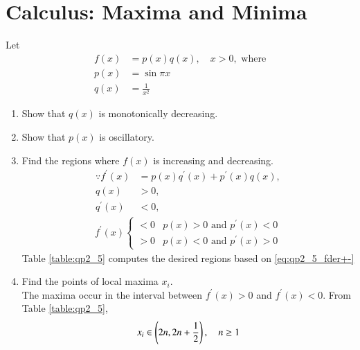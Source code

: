 \documentclass[journal,12pt,twocolumn]{IEEEtran}
\renewcommand\thesection{\arabic{section}}
\begin{document}
\section{Calculus: Maxima and Minima}
Let 
\begin{align}
\label{eq:qp2_5_max}
f(x) &= p(x)q(x), \quad x > 0, \text{ where}
\\
p(x) &= \sin \pi x
\\
q(x) &= \frac{1}{x^2}
\end{align}
\begin{enumerate}[label=\thesection.\arabic*
,ref=\thesection.\theenumi]
\item Show that $q(x)$ is monotonically decreasing.
\item Show that $p(x)$ is oscillatory. 
\item Find the regions where $f(x)$ is increasing and decreasing.
\\
\solution 
\begin{align}
\label{eq:qp2_5_fder}
\because
f^{\prime}(x) &= p(x)q^{\prime}(x)+p^{\prime}(x)q(x),
\\
q(x) &> 0, 
\\
q^{\prime}(x) & < 0, 
\end{align}
\begin{align}
\label{eq:qp2_5_fder+-}
f^{\prime}(x) 
\begin{cases}
< 0 & p(x) > 0 \text{ and } p^{\prime}(x) < 0
\\
 >  0 & p(x) < 0 \text{ and } p^{\prime}(x) > 0
\end{cases}
\end{align}
Table \ref{table:qp2_5} computes the desired regions based on \eqref{eq:qp2_5_fder+-}
\begin{table}[!h]
\centering
%

\caption{}
\label{table:qp2_5}
\end{table}
\item Find the points of local maxima  $x_i$.
\\
\solution The maxima occur in the interval between  $f^{\prime}(x) > 0 $ and $f^{\prime}(x) < 0 $.  From Table \ref{table:qp2_5}, 
\begin{align}
\label{eq:qp2_5_maxint}
x_i \in \left(2n, 2n+\frac{1}{2}\right), \quad n \ge 1
\end{align}


\end{enumerate}
\end{document}
